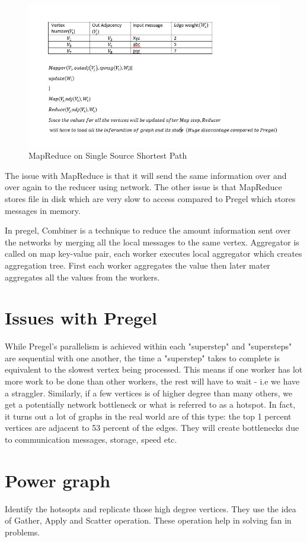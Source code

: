 \documentclass[twoside]{article}
\begin{document}
\begin{figure}[ht]
  \centering
  \includegraphics[width=0.7\linewidth]{MapReduce-on-SSSP.jpg}
  \caption{MapReduce on Single Source Shortest Path}
  \vspace{-0.2cm}
  \label{fig:blockdiagram}
  \vspace{-0.2cm}
\end{figure}

The issue with MapReduce is that it will send the same information over and over again to the reducer using network. The other issue is that MapReduce stores file in disk which are very slow to access compared to Pregel which stores messages in memory.

In pregel, Combiner is a technique to reduce the amount information sent over the networks by merging all the local messages to the same vertex. Aggregator is called on map key-value pair, each worker executes local aggregator which creates aggregation tree. First each worker aggregates the value then later mater aggregates all the values from the workers.

\section{Issues with Pregel}
While Pregel's parallelism is achieved within each "superstep" and "supersteps" are sequential with one another,
the time a "superstep" takes to complete is equivalent to the slowest vertex being processed. This means if one worker has lot more work to be done than other workers, the rest will have to wait - i.e we have a straggler. Similarly, if a few vertices is of higher degree than many others, we get a potentially network bottleneck or what is referred to as a hotspot. In fact, it turns out a lot of graphs in the real world are of this type:  the top 1 percent vertices are adjacent to 53 percent of the edges. They will create bottlenecks due to communication messages, storage, speed etc.

\section{Power graph}
Identify the hotsopts and replicate those high degree vertices. They use the idea of Gather, Apply and Scatter operation. These operation help in solving fan in problems. 
\end{document}
